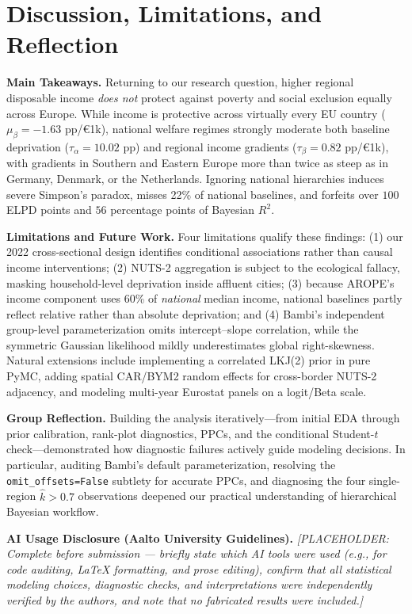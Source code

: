 \documentclass[11pt,a4paper]{article}
\begin{document}
\section{Discussion, Limitations, and Reflection}

\textbf{Main Takeaways.} Returning to our research question, higher regional disposable income \emph{does not} protect against poverty and social exclusion equally across Europe. While income is protective across virtually every EU country ($\mu_\beta = -1.63\text{ pp}$/\euro{}1k), national welfare regimes strongly moderate both baseline deprivation ($\tau_\alpha = 10.02\text{ pp}$) and regional income gradients ($\tau_\beta = 0.82\text{ pp}$/\euro{}1k), with gradients in Southern and Eastern Europe more than twice as steep as in Germany, Denmark, or the Netherlands. Ignoring national hierarchies induces severe Simpson's paradox, misses 22\% of national baselines, and forfeits over $100$ ELPD points and $56$ percentage points of Bayesian $R^2$.

\textbf{Limitations and Future Work.} Four limitations qualify these findings: (1) our 2022 cross-sectional design identifies conditional associations rather than causal income interventions; (2) NUTS-2 aggregation is subject to the ecological fallacy, masking household-level deprivation inside affluent cities; (3) because AROPE's income component uses 60\% of \emph{national} median income, national baselines partly reflect relative rather than absolute deprivation; and (4) Bambi's independent group-level parameterization omits intercept--slope correlation, while the symmetric Gaussian likelihood mildly underestimates global right-skewness. Natural extensions include implementing a correlated LKJ(2) prior in pure PyMC, adding spatial CAR/BYM2 random effects for cross-border NUTS-2 adjacency, and modeling multi-year Eurostat panels on a logit/Beta scale.

\textbf{Group Reflection.} Building the analysis iteratively---from initial EDA through prior calibration, rank-plot diagnostics, PPCs, and the conditional Student-$t$ check---demonstrated how diagnostic failures actively guide modeling decisions. In particular, auditing Bambi's default parameterization, resolving the \texttt{omit\_offsets=False} subtlety for accurate PPCs, and diagnosing the four single-region $\hat{k} > 0.7$ observations deepened our practical understanding of hierarchical Bayesian workflow.

\textbf{AI Usage Disclosure (Aalto University Guidelines).} \emph{[PLACEHOLDER: Complete before submission --- briefly state which AI tools were used (e.g., for code auditing, LaTeX formatting, and prose editing), confirm that all statistical modeling choices, diagnostic checks, and interpretations were independently verified by the authors, and note that no fabricated results were included.]}
\end{document}
